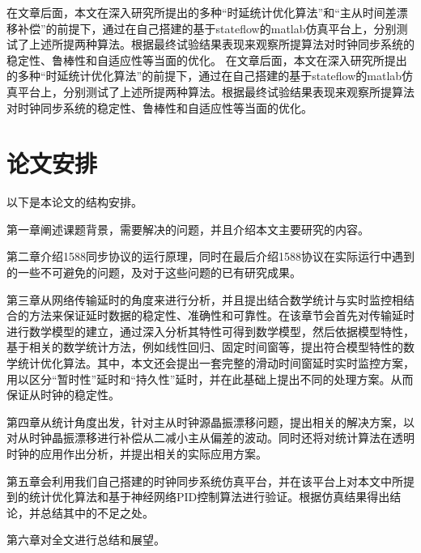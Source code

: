 在文章后面，本文在深入研究所提出的多种“时延统计优化算法”和“主从时间差漂移补偿”的前提下，通过在自己搭建的基于stateflow的matlab仿真平台上，分别测试了上述所提两种算法。根据最终试验结果表现来观察所提算法对时钟同步系统的稳定性、鲁棒性和自适应性等当面的优化。
在文章后面，本文在深入研究所提出的多种“时延统计优化算法”的前提下，通过在自己搭建的基于stateflow的matlab仿真平台上，分别测试了上述所提两种算法。根据最终试验结果表现来观察所提算法对时钟同步系统的稳定性、鲁棒性和自适应性等当面的优化。

\section{论文安排}
以下是本论文的结构安排。

第一章阐述课题背景，需要解决的问题，并且介绍本文主要研究的内容。

第二章介绍1588同步协议的运行原理，同时在最后介绍1588协议在实际运行中遇到的一些不可避免的问题，及对于这些问题的已有研究成果。

第三章从网络传输延时的角度来进行分析，并且提出结合数学统计与实时监控相结合的方法来保证延时数据的稳定性、准确性和可靠性。在该章节会首先对传输延时进行数学模型的建立，通过深入分析其特性可得到数学模型，然后依据模型特性，基于相关的数学统计方法，例如线性回归、固定时间窗等，提出符合模型特性的数学统计优化算法。其中，本文还会提出一套完整的滑动时间窗延时实时监控方案，用以区分“暂时性”延时和“持久性”延时，并在此基础上提出不同的处理方案。从而保证从时钟的稳定性。

第四章从统计角度出发，针对主从时钟源晶振漂移问题，提出相关的解决方案，以对从时钟晶振漂移进行补偿从二减小主从偏差的波动。同时还将对统计算法在透明时钟的应用作出分析，并提出相关的实际应用方案。

第五章会利用我们自己搭建的时钟同步系统仿真平台，并在该平台上对本文中所提到的统计优化算法和基于神经网络PID控制算法进行验证。根据仿真结果得出结论，并总结其中的不足之处。


第六章对全文进行总结和展望。
